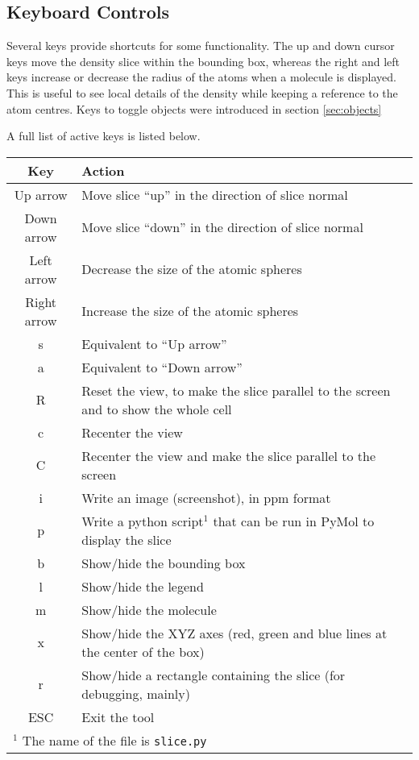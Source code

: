 \documentclass[a4paper,notitlepage,11pt]{article}
\begin{document}
\subsection{Keyboard Controls}
\label{sec:keyboard}

Several keys provide shortcuts for some functionality. The up and down cursor keys move the density 
slice within the bounding box, whereas the right and left keys increase or decrease the radius 
of the atoms when a molecule is displayed. This is useful to see local details of the density
while keeping a reference to the atom centres. 
Keys to toggle objects were introduced in section \ref{sec:objects}

A full list of active keys is listed below.

\begin{tabular}{cl}
\\
\hline \hline
Key&Action\\
\hline
Up arrow&Move slice ``up'' in the direction of slice normal\\
Down arrow&Move slice ``down'' in the direction of slice normal\\
Left arrow&Decrease the size of the atomic spheres\\
Right arrow&Increase the size of the atomic spheres\\
s&Equivalent to ``Up arrow''\\
a&Equivalent to ``Down arrow''\\
\hline
R&Reset the view, to make the slice parallel to the screen and to show the whole cell\\
c&Recenter the view\\
C&Recenter the view and make the slice parallel to the screen\\
\hline
i&Write an image (screenshot), in ppm format\\
p&Write a python script$^1$ that can be run in PyMol to display the slice\\
\hline
b&Show/hide the bounding box\\
l&Show/hide the legend\\
m&Show/hide the molecule\\
x&Show/hide the XYZ axes (red, green and blue lines at the center of the box)\\
r&Show/hide a rectangle containing the slice (for debugging, mainly)\\
\hline
ESC&Exit the tool\\
\hline \hline
\multicolumn{2}{l}{$^1$ The name of the file is \texttt{slice.py}}
\end{tabular}
\end{document}
